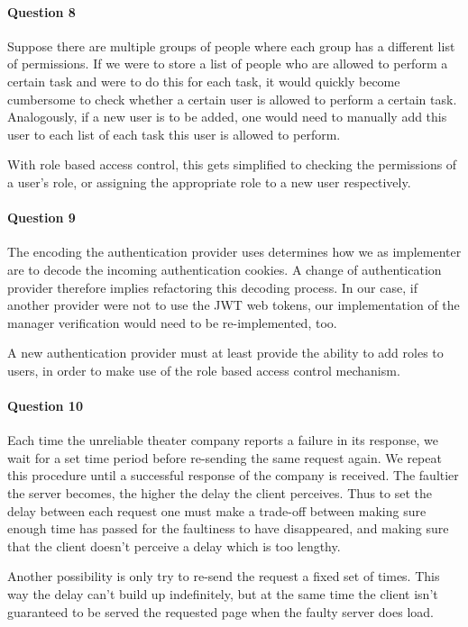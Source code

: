 \documentclass{ds-report}
\begin{document}
	\paragraph{Question 8} 
	Suppose there are multiple groups of people where each group has a different list of permissions. If we were to store a list of people who are allowed to perform a certain task and were to do this for each task, it would quickly become cumbersome to check whether a certain user is allowed to perform a certain task. Analogously, if a new user is to be added, one would need to manually add this user to each list of each task this user is allowed to perform.
	
	With role based access control, this gets simplified to checking the permissions of a user's role, or assigning the appropriate role to a new user respectively.
	
	\paragraph{Question 9}
	The encoding the authentication provider uses determines how we as implementer are to decode the incoming authentication cookies. A change of authentication provider therefore implies refactoring this decoding process. In our case, if another provider were not to use the JWT web tokens, our implementation of the manager verification would need to be re-implemented, too.
	
	A new authentication provider must at least provide the ability to add roles to users, in order to make use of the role based access control mechanism. 
	
	\paragraph{Question 10}
	Each time the unreliable theater company reports a failure in its response, we wait for a set time period before re-sending the same request again. We repeat this procedure until a successful response of the company is received. The faultier the server becomes, the higher the delay the client perceives. Thus to set the delay between each request 
	one must make a trade-off between making sure enough time has passed for the faultiness to have disappeared, and making sure that the client doesn't perceive a delay which is too lengthy. 
	
	Another possibility is only try to re-send the request a fixed set of times. This way the delay can't build up indefinitely, but at the same time the client isn't guaranteed to be served the requested page when the faulty server does load. 
	\clearpage
	
\end{document}
